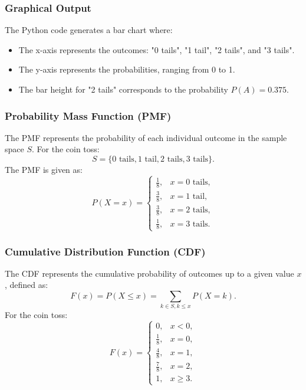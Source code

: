 \documentclass{beamer}
\begin{document}
\begin{frame}
\frametitle{Graphical Output}
The Python code generates a bar chart where:
\begin{itemize}
    \item The x-axis represents the outcomes: "0 tails", "1 tail", "2 tails", and "3 tails".
    \item The y-axis represents the probabilities, ranging from 0 to 1.
    \item The bar height for "2 tails" corresponds to the probability \(P(A) = 0.375\).
\end{itemize}
\end{frame}

\begin{frame}
\frametitle{Probability Mass Function (PMF)}
The PMF represents the probability of each individual outcome in the sample space \(S\). For the coin toss:
\[
S = \{0 \text{ tails}, 1 \text{ tail}, 2 \text{ tails}, 3 \text{ tails}\}.
\]
The PMF is given as:
\[
P(X = x) = 
\begin{cases} 
\frac{1}{8}, & x = 0 \text{ tails}, \\
\frac{3}{8}, & x = 1 \text{ tail}, \\
\frac{3}{8}, & x = 2 \text{ tails}, \\
\frac{1}{8}, & x = 3 \text{ tails}.
\end{cases}
\]
\end{frame}

\begin{frame}
\frametitle{Cumulative Distribution Function (CDF)}
The CDF represents the cumulative probability of outcomes up to a given value \(x\), defined as:
\[
F(x) = P(X \leq x) = \sum_{k \in S, k \leq x} P(X = k).
\]
For the coin toss:
\[
F(x) = 
\begin{cases} 
0, & x < 0, \\
\frac{1}{8}, & x = 0, \\
\frac{4}{8}, & x = 1, \\
\frac{7}{8}, & x = 2, \\
1, & x \geq 3.
\end{cases}
\]
\end{frame}
\end{document}
